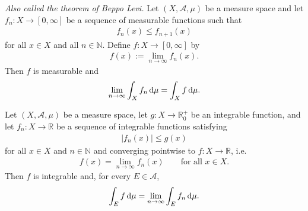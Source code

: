 \begin{theorem}
    \textit{Also called the theorem of Beppo Levi.}
    Let \( (X, \mathcal{A}, \mu) \) be a measure space and let \(f_n: X \rightarrow [0, \infty]\) be a sequence of measurable functions such that
    \begin{align}
        f_n(x) \leq f_{n+1}(x)
    \end{align}
    for all \(x \in X\) and all \(n \in \mathbb{N}\). Define \(f: X \rightarrow [0, \infty]\) by
    \begin{align}
        f(x) := \lim_{n \rightarrow \infty} f_n(x) \text{.}
    \end{align}
    Then \(f\) is measurable and
    \begin{align}
        \lim_{n \rightarrow \infty} \int_X f_n \mathop{}\!\mathrm{d} \mu = \int_X f \mathop{}\!\mathrm{d} \mu \text{.}
    \end{align}
\end{theorem}
%
\begin{theorem}
    Let \( (X, \mathcal{A}, \mu) \) be a measure space, let \(g: X \rightarrow \mathbb{R}_0^+\) be an integrable function, and let \(f_n: X \rightarrow \mathbb{R}\) be a sequence of integrable functions satisfying
    \begin{align}
        |f_n(x)| \leq g(x)
    \end{align}
    for all \(x \in X\) and \(n \in \mathbb{N}\) and converging pointwise to \(f: X \rightarrow \mathbb{R}\), i.e.
    \begin{align}
        f(x) = \lim_{n \rightarrow \infty} f_n(x) \qquad \text{for all \(x \in X\).}
    \end{align}
    Then \(f\) is integrable and, for every \(E \in \mathcal{A}\),
    \begin{align}
        \int_E f \mathop{}\!\mathrm{d} \mu = \lim_{n \rightarrow \infty} \int_E f_n \mathop{}\!\mathrm{d} \mu \text{.}
    \end{align}
\end{theorem}